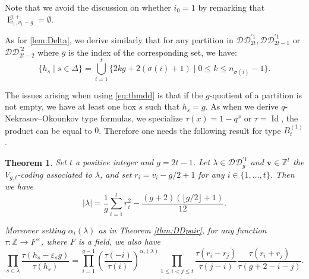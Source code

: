 \documentclass[11pt,letterpaper]{amsart}
\def\bbbz{\mathbb Z}
\def\cch{\mathcal H}
\def\ccdd{\mathcal {DD}}
\newtheorem{thm}[df]{Theorem}
\DeclareMathOperator{\Id}{Id}
\DeclareMathOperator{\I}{I}
\numberwithin{equation}{section}
\numberwithin{df}{section}
\begin{document}
Note that we avoid the discussion on whether $i_0=1$ by remarking that $\I_{v_1,v_1-g}^{g,+}=\emptyset$.

As for \eqref{lem:Delta}, we derive similarly that for any partition in $\ccdd_{2t}^{'1}, \ccdd_{2t-1}^{'1}$ or $\ccdd_{2t-2}^{'2}$ where $g$ is the index of the corresponding set, we have:
\begin{equation}\label{lem:Deltaddprime}
\lbrace h_s\mid s\in\Delta\rbrace=\bigcup_{i=1}^{t}\lbrace 2kg+2(\sigma(i)+1)\mid  0\leq k\leq n_{\sigma(i)}-1\rbrace.
\end{equation}


The issues arising when using \eqref{eq:thmdd} is that if the $g$-quotient of a partition is not empty, we have at least one box $s$ such that $h_s=g$. As when we derive $q$-Nekrasov--Okounkov type formulas, we specialize $\tau(x)=1-q^x$ or $\tau=\Id$, the product can be equal to $0$. Therefore one needs the following result for type $B^{(1)}_{t}$.

\begin{thm}\label{thm:DDtquotimpair}
Set $t$ a positive integer and $g=2t-1$. Let $\lambda\in \ccdd_{g}^{'1}$ and $\mathbf{v}\in\bbbz^{t}$ the $V_{g,t}$-coding associated to $\lambda$, and set $r_i=v_i-g/2+1$ for any $i\in\lbrace1,\dots,t\rbrace$. Then we have
$$\lvert \lambda\rvert = \frac{1}{g}\sum_{i=1}^{t} r_i^2-\frac{(g+2)(\lfloor g/2\rfloor +1)}{12}.$$

Moreover setting $\alpha_i(\lambda)$ as in Theorem \ref{thm:DDpair}, for any function $\tau:\bbbz\rightarrow F^{\times}$, where $F$ is a field, we also have
\begin{equation}\label{eq:thmddprimepairtimpairquot}
\prod_{s\in\lambda}\frac{\tau(h_s-\varepsilon_s g)}{\tau(h_s)}=\prod_{i=1}^{g-1}\left(\frac{\tau(-i)}{\tau(i)}\right)^{\alpha_i(\lambda)}
\prod_{1\leq i<j\leq t} \frac{\tau(r_i-r_j)}{\tau(j-i)} \frac{\tau(r_i+r_j)}{\tau(g+2-i-j)}.
\end{equation}

\end{thm}
\end{document}
